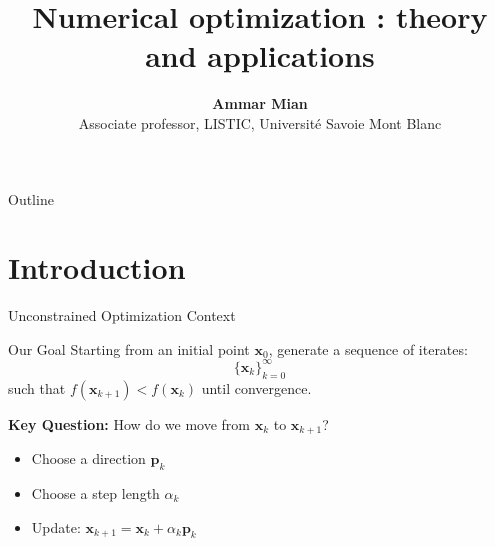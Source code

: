 \documentclass[aspectratio=1610]{beamer}
\title[Numerical optimization]{Numerical optimization : theory and applications}
\date[]{}
\author[AM]{\textbf{Ammar Mian} \\ \footnotesize Associate professor, LISTIC, Université Savoie Mont Blanc}
\begin{document}


  
\begin{frame}
\titlepage
\end{frame}
\begingroup
{}
\begin{frame}{Outline}
    \tableofcontents[]
\end{frame}

\endgroup






\section{Introduction}

\begin{frame}{Unconstrained Optimization Context}
  \begin{block}{Our Goal}
    Starting from an initial point $\mathbf{x}_0$, generate a sequence of iterates:
    $$\{\mathbf{x}_k\}_{k=0}^{\infty}$$
    such that $f(\mathbf{x}_{k+1}) < f(\mathbf{x}_k)$ until convergence.
  \end{block}
  
  \vspace{0.3cm}
  
  \textbf{Key Question:} How do we move from $\mathbf{x}_k$ to $\mathbf{x}_{k+1}$?
  
  \vspace{0.3cm}
  
  \begin{itemize}
    \item Choose a direction $\mathbf{p}_k$
    \item Choose a step length $\alpha_k$
    \item Update: $\mathbf{x}_{k+1} = \mathbf{x}_k + \alpha_k \mathbf{p}_k$
  \end{itemize}
\end{frame}
\end{document}

